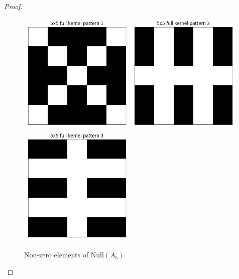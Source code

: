 \documentclass[a4paper]{article}
\begin{document}
\begin{proof}
		\begin{figure}[H]
			\begin{center}
				\includegraphics[width=0.49\textwidth]{../../code/serialization/kernels/5x5/full/5x5_kernel_full_1.png}
				\includegraphics[width=0.49\textwidth]{../../code/serialization/kernels/5x5/full/5x5_kernel_full_2.png}
				\includegraphics[width=0.49\textwidth]{../../code/serialization/kernels/5x5/full/5x5_kernel_full_3.png}
			\end{center}
			\caption{Non-zero elements of $\text{Null}(A_5)$}
		\end{figure}
	

\end{proof}
\end{document}
